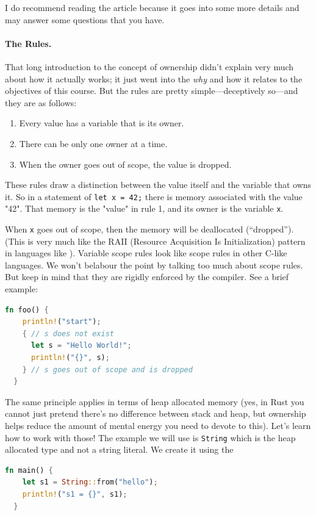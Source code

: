 I do recommend reading the article because it goes into some more details and may answer some questions that you have. 

\paragraph{The Rules.}
That long introduction to the concept of ownership didn't explain very much about how it actually works; it just went into the \textit{why} and how it relates to the objectives of this course. But the rules are pretty simple---deceptively so---and they are as follows:

\begin{enumerate}
	\item Every value has a variable that is its owner.
	\item There can be only one owner at a time.
	\item When the owner goes out of scope, the value is dropped.
\end{enumerate}

These rules draw a distinction between the value itself and the variable that owns it. So in a statement of \texttt{let x = 42;} there is memory associated with the value "42". That memory is the "value" in rule 1, and its owner is the variable \texttt{x}.

When \texttt{x} goes out of scope, then the memory will be deallocated (``dropped''). (This is very much like the RAII (Resource Acquisition Is Initialization) pattern in languages like \CPP). Variable scope rules look like scope rules in other C-like languages. We won't belabour the point by talking too much about scope rules. But keep in mind that they are rigidly enforced by the compiler. See a brief example:
\begin{lstlisting}[language=Rust]
  fn foo() {
    println!("start");
    { // s does not exist
      let s = "Hello World!";
      println!("{}", s);
    } // s goes out of scope and is dropped
  }
\end{lstlisting}

The same principle applies in terms of heap allocated memory (yes, in Rust you cannot just pretend there's no difference between stack and heap, but ownership helps reduce the amount of mental energy you need to devote to this). Let's learn how to work with those! The example we will use is \texttt{String} which is the heap allocated type and not a string literal. We create it using the 
\begin{lstlisting}[language=Rust]
  fn main() {
    let s1 = String::from("hello");
    println!("s1 = {}", s1);
  }
\end{lstlisting}

